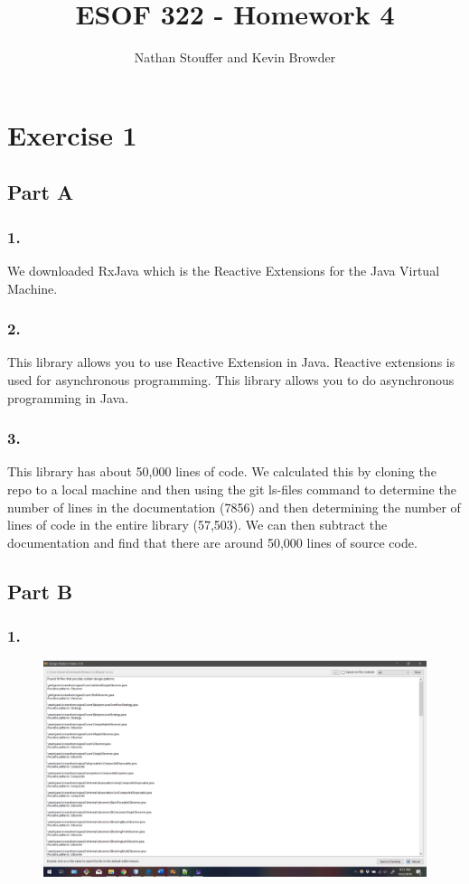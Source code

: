 \documentclass{article}
\begin{document}
	
\title{ESOF 322 - Homework 4}
\author{Nathan Stouffer and Kevin Browder}

\maketitle
\newpage

\section*{Exercise 1}

\subsection*{Part A}
\subsubsection*{1.}
We downloaded RxJava which is the Reactive Extensions for the Java Virtual Machine.
\subsubsection*{2.}
This library allows you to use Reactive Extension in Java. Reactive extensions is used for asynchronous programming. This library allows you to do asynchronous programming in Java.
\subsubsection*{3.}
This library has about 50,000 lines of code. We calculated this by cloning the repo to a local machine and then using the git ls-files command to determine the number of lines in the documentation (7856) and then determining the number of lines of code in the entire library (57,503). We can then subtract the documentation and find that there are around 50,000 lines of source code.
\subsection*{Part B}
\subsubsection*{1.}
\begin{figure}[h]
	\centering
	\includegraphics[width=6in]{hw4-patterns.png}
\end{figure}
\end{document}
